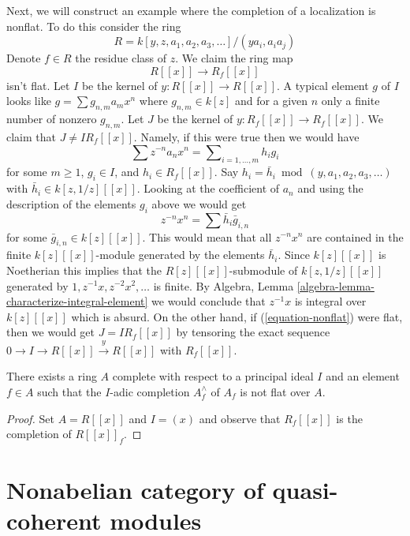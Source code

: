 \noindent
Next, we will construct an example where the completion of a localization
is nonflat. To do this consider the ring
$$
R = k[y, z, a_1, a_2, a_3, \ldots]/(ya_i, a_i a_j)
$$
Denote $f \in R$ the residue class of $z$. We claim the ring map
\begin{equation}
\label{equation-nonflat}
R[[x]] \longrightarrow R_f[[x]]
\end{equation}
isn't flat. Let $I$ be the kernel of $y : R[[x]] \to R[[x]]$. A typical
element $g$ of $I$ looks like $g = \sum g_{n, m} a_mx^n$
where $g_{n, m} \in k[z]$ and for a given $n$ only a finite number of
nonzero $g_{n, m}$. Let $J$ be the kernel of $y : R_f[[x]] \to R_f[[x]]$.
We claim that $J \not = I R_f[[x]]$. Namely, if this were true then we
would have
$$
\sum z^{-n} a_n x^n = \sum\nolimits_{i = 1, \ldots, m} h_i g_i
$$
for some $m \geq 1$, $g_i \in I$, and $h_i \in R_f[[x]]$. Say
$h_i = \bar h_i \bmod (y, a_1, a_2, a_3, \ldots)$
with $\bar h_i \in k[z, 1/z][[x]]$.  Looking at the coefficient of
$a_n$ and using the description of the elements $g_i$ above we would get
$$
z^{-n} x^n = \sum \bar h_i \bar g_{i, n}
$$
for some $\bar g_{i, n} \in k[z][[x]]$. This would mean that
all $z^{-n}x^n$ are contained in the finite $k[z][[x]]$-module
generated by the elements $\bar h_i$. Since $k[z][[x]]$ is Noetherian
this implies that the $R[z][[x]]$-submodule of $k[z, 1/z][[x]]$
generated by $1, z^{-1}x, z^{-2}x^2, \ldots$ is finite. By
Algebra, Lemma \ref{algebra-lemma-characterize-integral-element}
we would conclude that $z^{-1}x$ is integral over $k[z][[x]]$
which is absurd. On the other hand,
if (\ref{equation-nonflat}) were flat, then we would
get $J = IR_f[[x]]$ by tensoring the exact sequence
$0 \to I \to R[[x]] \xrightarrow{y} R[[x]]$ with $R_f[[x]]$.

\begin{lemma}
\label{lemma-nonflat-completion-localization}
There exists a ring $A$ complete with respect to a principal ideal $I$
and an element $f \in A$ such that the $I$-adic completion
$A_f^\wedge$ of $A_f$ is not flat over $A$.
\end{lemma}

\begin{proof}
Set $A = R[[x]]$ and $I = (x)$ and observe that $R_f[[x]]$
is the completion of $R[[x]]_f$.
\end{proof}





\section{Nonabelian category of quasi-coherent modules}
\label{section-nonabelian-QCoh}


